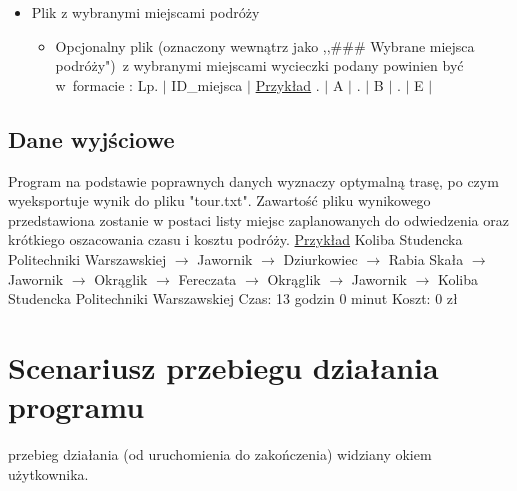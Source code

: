\documentclass[10pt,oneside]{article}
\begin{document}
\begin{itemize}
	\item Plik z wybranymi miejscami podróży
	\begin{itemize}
		\item Opcjonalny plik (oznaczony wewnątrz jako ,,\#\#\# Wybrane miejsca podróży")~z wybranymi miejscami wycieczki podany powinien być w~formacie : \newline
		Lp. $\vert$ ID\_miejsca $\vert$
		\newline \newline
		\underline{Przykład}
		\newline {}. $\vert$ A $\vert$ . $\vert$ B $\vert$ . $\vert$ E $\vert$ \newline
	\end{itemize}
\end{itemize}

\subsection{Dane wyjściowe}
Program na podstawie poprawnych danych wyznaczy optymalną trasę, po czym wyeksportuje wynik do pliku "tour.txt".
Zawartość pliku wynikowego przedstawiona zostanie w postaci listy miejsc zaplanowanych do odwiedzenia oraz krótkiego oszacowania czasu i kosztu podróży.
\newline \newline
\underline{Przykład}
\newline \newline
Koliba Studencka Politechniki Warszawskiej \newline
$\to$ Jawornik \newline
$\to$ Dziurkowiec \newline
$\to$ Rabia Skała \newline
$\to$ Jawornik \newline
$\to$ Okrąglik \newline
$\to$ Fereczata \newline
$\to$ Okrąglik \newline
$\to$ Jawornik \newline
$\to$ Koliba Studencka Politechniki Warszawskiej \newline
Czas: 13 godzin 0 minut \newline
Koszt: 0 zł \newline


\section{Scenariusz przebiegu działania programu}
przebieg działania (od uruchomienia do zakończenia) widziany okiem użytkownika.
\end{document}
